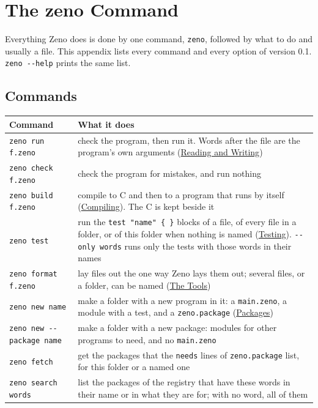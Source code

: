 \chapter{The zeno Command}\label{app-commands}

Everything Zeno does is done by one command, \verb|zeno|, followed by
what to do and usually a file. This appendix lists every command and
every option of version 0.1. \verb|zeno --help| prints the same list.

\section{Commands}

\begin{longtable}{lP{8.6cm}}
\toprule
Command & What it does \\
\midrule
\endhead
\verb|zeno run f.zeno| & check the program, then run it. Words after
  the file are the program's own arguments
  (\hyperref[ch-reading-writing]{Reading and Writing}) \\
\verb|zeno check f.zeno| & check the program for mistakes, and run
  nothing \\
\verb|zeno build f.zeno| & compile to C and then to a program that runs
  by itself (\hyperref[ch-compiling]{Compiling}). The C is kept beside
  it \\
\verb|zeno test| & run the \verb|test "name" { }| blocks of a file, of
  every file in a folder, or of this folder when nothing is named
  (\hyperref[ch-testing]{Testing}). \verb|--only words| runs only the
  tests with those words in their names \\
\verb|zeno format f.zeno| & lay files out the one way Zeno lays them
  out; several files, or a folder, can be named
  (\hyperref[ch-tools]{The Tools}) \\
\verb|zeno new name| & make a folder with a new program in it: a
  \verb|main.zeno|, a module with a test, and a \verb|zeno.package|
  (\hyperref[ch-packages]{Packages}) \\
\verb|zeno new --package name| & make a folder with a new package: modules
  for other programs to need, and no \verb|main.zeno| \\
\verb|zeno fetch| & get the packages that the \verb|needs| lines of
  \verb|zeno.package| list, for this folder or a named one \\
\verb|zeno search words| & list the packages of the registry that have
  these words in their name or in what they are for; with no word, all
  of them \\

\end{longtable}
